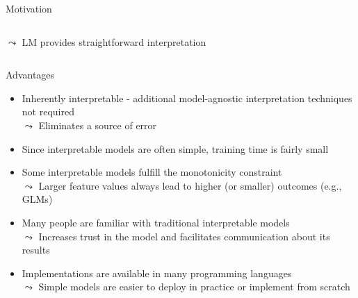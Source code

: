 \documentclass[11pt,compress,t,notes=noshow, aspectratio=169, xcolor=table]{beamer}
\begin{document}
\begin{frame}{Motivation}
\begin{columns}[T, totalwidth = \linewidth]
\begin{column}{0.45\textwidth}
  \begin{center}
    $\leadsto$ LM provides straightforward interpretation
  \end{center}
    \end{column}
\end{columns}
\end{frame}

\begin{frame}{Advantages}

    \begin{itemize}[<+->]
    \itemsep1em
        \item Inherently interpretable - additional model-agnostic interpretation techniques not required \\
        $\leadsto$ Eliminates a source of error
        \item Since interpretable models are often simple, training time is fairly small
        \item Some interpretable models fulfill the monotonicity constraint \\
        $\leadsto$ Larger feature values always lead to higher (or smaller) outcomes (e.g., GLMs)
        \item Many people are familiar with traditional interpretable models \\
        $\leadsto$ Increases trust in the model and facilitates communication about its results
        \item Implementations are available in many programming languages \\
        $\leadsto$ Simple models are easier to deploy in practice or implement from scratch
    \end{itemize}

\end{frame}
\end{document}
